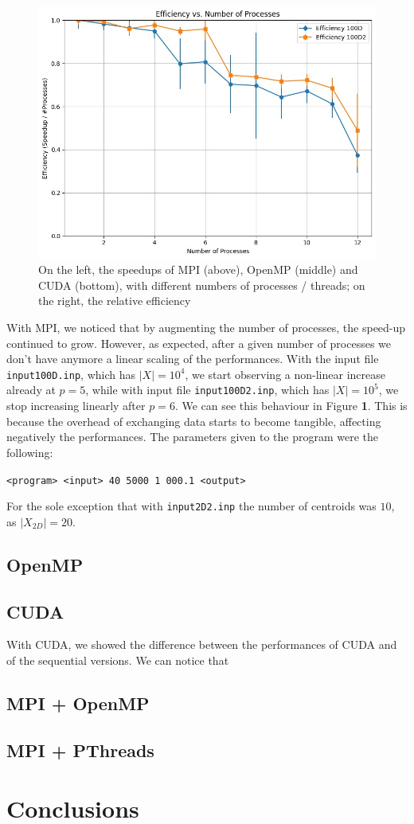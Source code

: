 \documentclass[11pt, journal]{IEEEtran}
\begin{document}
\begin{figure}
    \includegraphics[width = 0.49\linewidth]{imgs/mpi_eff.jpeg}
    \caption{On the left, the speedups of MPI (above), OpenMP (middle) and CUDA (bottom), with different numbers of processes / threads; on the right, the relative efficiency}
\end{figure}

With MPI, we noticed that by augmenting the number of processes, the speed-up continued to grow. However, as expected, after a given number of processes we don't have anymore a linear scaling of the performances. With the input file \verb|input100D.inp|, which has $|X| = 10^4$, we start observing a non-linear increase already at $p = 5$, while with input file \verb|input100D2.inp|, which has $|X| = 10^5$, we stop increasing linearly after $p = 6$. We can see this behaviour in Figure \textbf{1}. This is because the overhead of exchanging data starts to become tangible, affecting negatively the performances. The parameters given to the program were the following:

\begin{center}
    \footnotesize
    \verb|<program> <input> 40 5000 1 000.1 <output>|
\end{center}

For the sole exception that with \verb|input2D2.inp| the number of centroids was $10$, as $|X_{2D}| = 20$.

\subsection{OpenMP}

\subsection{CUDA}

With CUDA, we showed the difference between the performances of CUDA and of the sequential versions. We can notice that 

\subsection{MPI + OpenMP}

\subsection{MPI + PThreads}

\section{Conclusions}


\end{document}
